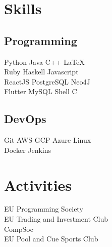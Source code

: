 \documentclass[]{deedy-resume-openfont}
\begin{document}
\begin{minipage}[t]{0.33\textwidth}
\section{Skills}
\subsection{Programming}
Python \textbullet{} Java \textbullet{} C++ \textbullet{} \LaTeX\ \\ 
Ruby \textbullet{} Haskell \textbullet{} Javascript \\
ReactJS \textbullet{} PostgreSQL \textbullet{} Neo4J \\
Flutter \textbullet{} MySQL \textbullet{} Shell \textbullet{} C
\subsection{DevOps}
Git \textbullet{} AWS \textbullet{} GCP \textbullet{} Azure \textbullet{} Linux \\
Docker \textbullet{} Jenkins
\sectionsep
\section{Activities}
EU Programming Society \\
EU Trading and Investment Club \\
CompSoc \\
EU Pool and Cue Sports Club

\end{minipage}%
\end{document}
